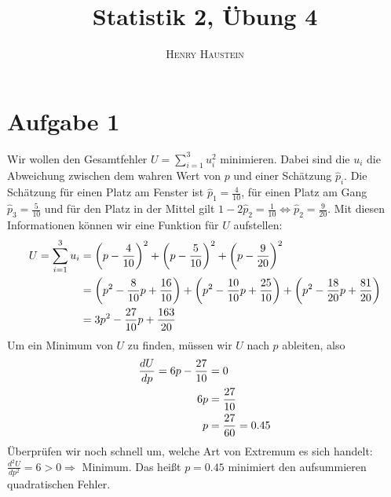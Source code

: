 \documentclass{article}
\title{\textbf{Statistik 2, Übung 4}}
\author{\textsc{Henry Haustein}}
\date{}
\begin{document}
	\maketitle
	
	\section*{Aufgabe 1}
	Wir wollen den Gesamtfehler $U = \sum_{i=1}^{3} u_i^2$ minimieren. Dabei sind die $u_i$ die Abweichung zwischen dem wahren Wert von $p$ und einer Schätzung $\hat{p}_i$. Die Schätzung für einen Platz am Fenster ist $\hat{p}_1 = \frac{4}{10}$, für einen Platz am Gang $\hat{p}_3 = \frac{5}{10}$ und für den Platz in der Mittel gilt $1-2\hat{p}_2 = \frac{1}{10} \Leftrightarrow \hat{p}_2 = \frac{9}{20}$. Mit diesen Informationen können wir eine Funktion für $U$ aufstellen:
	\begin{align}
		U = \sum_{i=1}^3 u_i &= \left(p-\frac{4}{10}\right)^2 + \left(p-\frac{5}{10}\right)^2 + \left(p-\frac{9}{20}\right)^2 \notag \\
		&= \left(p^2 - \frac{8}{10}p + \frac{16}{10}\right) + \left(p^2 - \frac{10}{10}p + \frac{25}{10}\right) + \left(p^2 - \frac{18}{20}p + \frac{81}{20}\right) \notag \\
		&= 3p^2 - \frac{27}{10}p + \frac{163}{20} \notag
	\end{align}
	Um ein Minimum von $U$ zu finden, müssen wir $U$ nach $p$ ableiten, also
	\begin{align}
		\frac{dU}{dp} = 6p - \frac{27}{10} &= 0 \notag \\
		6p &= \frac{27}{10} \notag \\
		p &= \frac{27}{60} = 0.45 \notag
	\end{align}
	Überprüfen wir noch schnell um, welche Art von Extremum es sich handelt: $\frac{d^2U}{dp^2} = 6 > 0 \Rightarrow$ Minimum. Das heißt $p=0.45$ minimiert den aufsummieren quadratischen Fehler.
	
\end{document}
